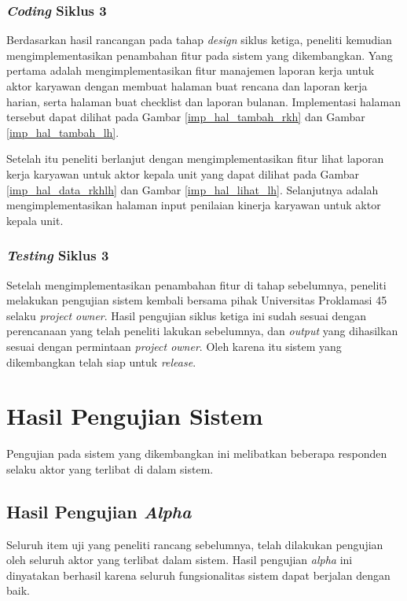 	\subsubsection{\emph{Coding} Siklus 3}
	Berdasarkan hasil rancangan pada tahap \emph{design} siklus ketiga, peneliti kemudian mengimplementasikan penambahan fitur pada sistem yang dikembangkan. Yang pertama adalah mengimplementasikan fitur manajemen laporan kerja untuk aktor karyawan dengan membuat halaman buat rencana dan laporan kerja harian, serta halaman buat checklist dan laporan bulanan. Implementasi halaman tersebut dapat dilihat pada Gambar \ref{imp_hal_tambah_rkh} dan Gambar \ref{imp_hal_tambah_lh}.
	
	Setelah itu peneliti berlanjut dengan mengimplementasikan fitur lihat laporan kerja karyawan untuk aktor kepala unit yang dapat dilihat pada Gambar \ref{imp_hal_data_rkhlh} dan Gambar \ref{imp_hal_lihat_lh}. Selanjutnya adalah mengimplementasikan halaman input penilaian kinerja karyawan untuk aktor kepala unit.
	
	\subsubsection{\emph{Testing} Siklus 3}
	Setelah mengimplementasikan penambahan fitur di tahap sebelumnya, peneliti melakukan pengujian sistem kembali bersama pihak Universitas Proklamasi 45 selaku \emph{project owner}. Hasil pengujian siklus ketiga ini sudah sesuai dengan perencanaan yang telah peneliti lakukan sebelumnya, dan \emph{output} yang dihasilkan sesuai dengan permintaan \emph{project owner}. Oleh karena itu sistem yang dikembangkan telah siap untuk \emph{release}.
	
	\section{Hasil Pengujian Sistem}
	Pengujian pada sistem yang dikembangkan ini melibatkan beberapa responden selaku aktor yang terlibat di dalam sistem.
	
	\subsection{Hasil Pengujian \emph{Alpha}}
	Seluruh item uji yang peneliti rancang sebelumnya, telah dilakukan pengujian oleh seluruh aktor yang terlibat dalam sistem. Hasil pengujian \emph{alpha} ini dinyatakan berhasil karena seluruh fungsionalitas sistem dapat berjalan dengan baik.
	
